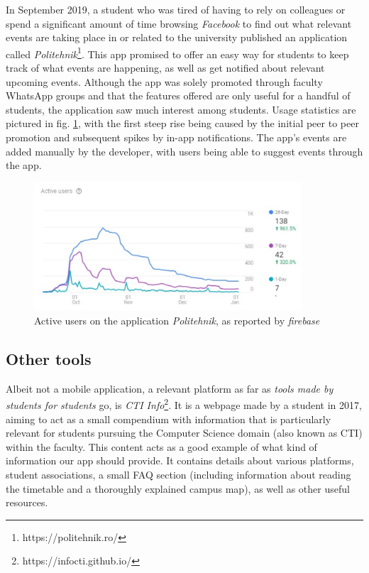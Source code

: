     In September 2019, a student who was tired of having to rely on colleagues or spend a significant amount of time browsing \textit{Facebook} to find out what relevant events are taking place in or related to the university published an application called \textit{Politehnik}\footnote{https://politehnik.ro/}. This app promised to offer an easy way for students to keep track of what events are happening, as well as get notified about relevant upcoming events. Although the app was solely promoted through faculty WhatsApp groups and that the features offered are only useful for a handful of students, the application saw much interest among students. Usage statistics are pictured in fig. \ref{2:fig:politehnik_usage}, with the first steep rise being caused by the initial peer to peer promotion and subsequent spikes by in-app notifications. The app's events are added manually by the developer, with users being able to suggest events through the app.
    
    \begin{figure}[ht]
        \centering
             \includegraphics[width=0.89\textwidth]{figures/charts/politehnik_usage.png}
        \caption{Active users on the application \textit{Politehnik}, as reported by \textit{\gls{firebase}}}
        \label{2:fig:politehnik_usage}
    \end{figure}
    
    \subsection{Other tools} \label{2:existing_apps_other}
    Albeit not a mobile application, a relevant platform as far as \textit{tools made by students for students} go, is \textit{CTI Info}\footnote{https://infocti.github.io/}. It is a webpage made by a student in 2017, aiming to act as a small compendium with information that is particularly relevant for students pursuing the Computer Science domain (also known as CTI) within the faculty. This content acts as a good example of what kind of information our app should provide. It contains details about various platforms, student associations, a small FAQ section (including information about reading the timetable and a thoroughly explained campus map), as well as other useful resources.

